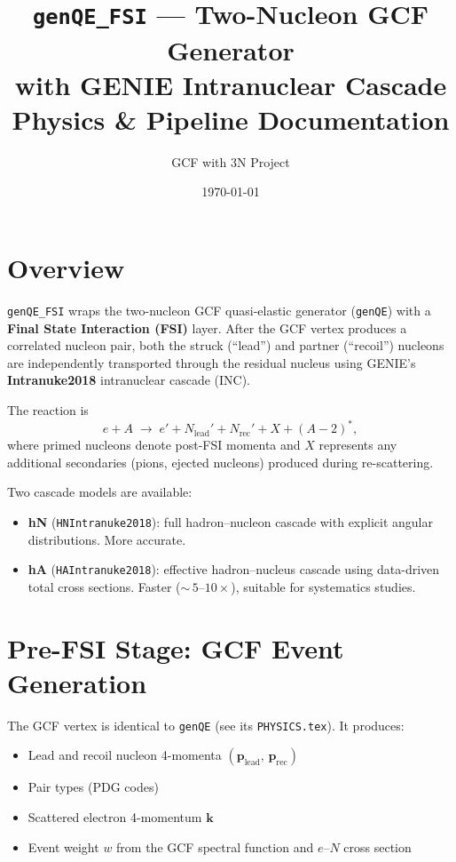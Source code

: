 \documentclass[11pt,a4paper]{article}
\title{\texttt{genQE\_FSI} --- Two-Nucleon GCF Generator\\
       with GENIE Intranuclear Cascade\\[4pt]
       \large Physics \& Pipeline Documentation}
\author{GCF with 3N Project}
\date{\today}
\newcommand{\vect}[1]{\bm{#1}}
\begin{document}
\maketitle
\tableofcontents
\newpage

\section{Overview}

\texttt{genQE\_FSI} wraps the two-nucleon GCF quasi-elastic generator
(\texttt{genQE}) with a \textbf{Final State Interaction (FSI)} layer.
After the GCF vertex produces a correlated nucleon pair, both the
struck (``lead'') and partner (``recoil'') nucleons are independently
transported through the residual nucleus using GENIE's
\textbf{Intranuke2018} intranuclear cascade (INC).

The reaction is
\begin{equation}
  e + A \;\longrightarrow\; e' + N_{\text{lead}}' + N_{\text{rec}}'
                           + X + (A{-}2)^{*},
\end{equation}
where primed nucleons denote post-FSI momenta and $X$ represents any
additional secondaries (pions, ejected nucleons) produced during
re-scattering.

Two cascade models are available:
\begin{itemize}[nosep]
  \item \textbf{hN} (\texttt{HNIntranuke2018}): full hadron--nucleon
        cascade with explicit angular distributions.  More accurate.
  \item \textbf{hA} (\texttt{HAIntranuke2018}): effective hadron--nucleus
        cascade using data-driven total cross sections.  Faster
        (${\sim}\,5$--$10\times$), suitable for systematics studies.
\end{itemize}

\section{Pre-FSI Stage: GCF Event Generation}

The GCF vertex is identical to \texttt{genQE} (see its \texttt{PHYSICS.tex}).
It produces:
\begin{itemize}[nosep]
  \item Lead and recoil nucleon 4-momenta
        $(\vect{p}_{\text{lead}},\,\vect{p}_{\text{rec}})$
  \item Pair types (PDG codes)
  \item Scattered electron 4-momentum $\vect{k}$
  \item Event weight $w$ from the GCF spectral function and $e$--$N$
        cross section
\end{itemize}
\end{document}
